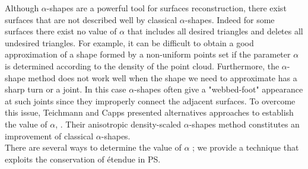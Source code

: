 \indent Although $\alpha$-shapes are a powerful tool for surfaces reconstruction, there exist surfaces that are not described well by classical $ \alpha $-shapes. Indeed for some surfaces there exist no value of $\alpha$ that includes all desired triangles and deletes all undesired triangles. For example, it can be difficult to obtain a good approximation of a shape formed by a non-uniform points set if the parameter $\alpha$ is determined according to the density of the point cloud. Furthermore, the $\alpha$-shape method does not work well when the shape we need to approximate has a sharp turn or a joint. In this case $\alpha$-shapes often give a "webbed-foot" appearance at such joints since they improperly connect the adjacent surfaces. To overcome this issue, Teichmann and Capps presented alternatives approaches to establish the value of $\alpha$, \cite{teichmann1998surface}. Their anisotropic density-scaled $\alpha$-shapes method constitutes an improvement of  classical $\alpha$-shapes.
\\ \indent There are several ways to determine the value of $\alpha$ \cite{mandal1997selection}; we provide a technique that exploits the conservation of \'{e}tendue in PS. 
